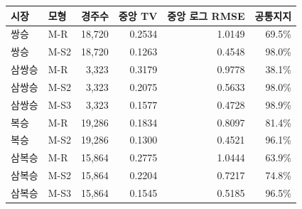 \begin{tabular}{llrrrr}
\toprule
시장 & 모형 & 경주수 & 중앙 TV & 중앙 로그 RMSE & 공통지지 \\
\midrule
쌍승 & M-R & 18,720 & 0.2534 & 1.0149 & 69.5\% \\
쌍승 & M-S2 & 18,720 & 0.1263 & 0.4548 & 98.0\% \\
\addlinespace
삼쌍승 & M-R & 3,323 & 0.3179 & 0.9778 & 38.1\% \\
삼쌍승 & M-S2 & 3,323 & 0.2075 & 0.5633 & 98.0\% \\
삼쌍승 & M-S3 & 3,323 & 0.1577 & 0.4728 & 98.9\% \\
\addlinespace
복승 & M-R & 19,286 & 0.1834 & 0.8097 & 81.4\% \\
복승 & M-S2 & 19,286 & 0.1300 & 0.4521 & 96.1\% \\
\addlinespace
삼복승 & M-R & 15,864 & 0.2775 & 1.0444 & 63.9\% \\
삼복승 & M-S2 & 15,864 & 0.2204 & 0.7217 & 74.8\% \\
삼복승 & M-S3 & 15,864 & 0.1545 & 0.5185 & 96.5\% \\
\bottomrule
\end{tabular}

